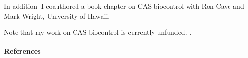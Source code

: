 \begin{refsection}
In addition, I coauthored a book chapter on CAS biocontrol with Ron Cave and Mark Wright, University of Hawaii.

Note that my work on CAS biocontrol is currently unfunded. \cite{cave_biological_2022}.

\begin{comment}
\paragraph{Plans 15JUN2021-14JUN2022}

I am collaborating with the US Fish and Wildlife Service on prospects for CAS biocontrol. On my suggestion USFWS is considering funding a consulting trip to Guam by Dr. Ron Cave, a CAS biocontrol expert from the University of Florida.  

\paragraph{Plans 15JUN2022-14JUN2023}
I will work to help find funding to implement Dr. Cave's recommendations. 
\end{comment}
\paragraph{References}
\printbibliography[heading=none]

\end{refsection}

